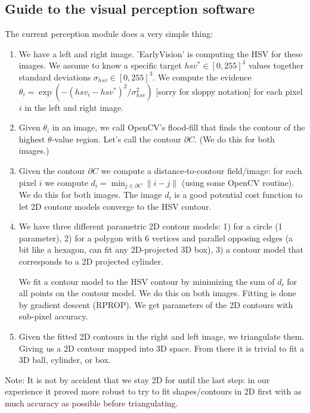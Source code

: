 \subsection{Guide to the visual perception software}

The current perception module does a very simple thing:
\begin{enumerate}
\item We have a left and right image. 'EarlyVision' is computing the
  HSV for these images. We assume to know a specific target $hsv^*\in[0,255]^3$
  values together standard deviations $\sigma_{hsv}\in[0,255]^3$. We compute
  the evidence $\theta_i = \exp(- (hsv_i-hsv^*)^2/\sigma_{hsv}^2)$ [sorry for
    sloppy notation] for each pixel $i$ in the left and right image.

\item Given $\theta_i$ in an image, we call OpenCV's flood-fill that finds
  the contour of the highest $\theta$-value region. Let's call the contour
  $\partial C$. (We do this for both images.)

\item Given the contour $\partial C$ we compute a distance-to-contour
  field/image: for each pixel $i$ we compute $d_i = \min_{j\in\partial C}
  \|i-j\|$ (using some OpenCV routine). We do this for both images. The
  image $d_i$ is a good potential cost function to let 2D contour
  models converge to the HSV contour.

\item We have three different parametric 2D contour models: 1) for a
  circle (1 parameter), 2) for a polygon with 6 vertices and parallel
  opposing edges (a bit like a hexagon, can fit any 2D-projected 3D
  box), 3) a contour model that corresponds to a 2D projected
  cylinder.

  We fit a contour model to the HSV contour by minimizing the sum of
  $d_i$ for all points on the contour model. We do this on both
  images. Fitting is done by gradient descent (RPROP). We get
  parameters of the 2D contours with sub-pixel accuracy.

\item Given the fitted 2D contours in the right and left image, we
  triangulate them. Giving us a 2D contour mapped into 3D space. From
  there it is trivial to fit a 3D ball, cylinder, or box.

\end{enumerate}

Note: It is not by accident that we stay 2D for until the last step:
in our experience it proved more robust to try to fit shapes/contours
in 2D first with as much accuracy as possible before triangulating.




